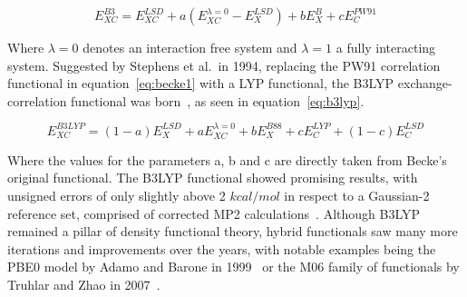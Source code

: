 \documentclass[12pt]{article}
\begin{document}
\begin{equation}
  E_{XC}^{B3} = E_{XC}^{LSD}+a(E_{XC}^{\lambda = 0}-E_{X}^{LSD})+bE_{X}^{B}+cE_{C}^{PW91}
  \label{eq:becke1}
\end{equation}

\bigskip

\noindent Where $\lambda=0$ denotes an interaction free system and $\lambda=1$ a fully interacting system.
Suggested by Stephens et al.~in 1994, replacing the PW91 correlation functional in equation~\ref{eq:becke1} with a LYP functional, the B3LYP exchange-correlation functional was born~\cite{stephens_ab_1994}, as seen in equation~\ref{eq:b3lyp}.

\begin{equation}
  E_{XC}^{B3LYP} = (1-a) E_{X}^{LSD}+aE_{XC}^{\lambda = 0}+bE_{X}^{B88}+cE_{C}^{LYP}+(1-c)E_C^{LSD}
  \label{eq:b3lyp}
\end{equation}

\bigskip

\noindent Where the values for the parameters a, b and c are directly taken from Becke's original functional.
The B3LYP functional showed promising results, with unsigned errors of only slightly above 2 $kcal/mol$ in respect to a Gaussian-2 reference set, comprised of corrected MP2 calculations~\cite{Curtiss1991}.
Although B3LYP remained a pillar of density functional theory, hybrid functionals saw many more iterations and improvements over the years, with notable examples being the PBE0 model by Adamo and Barone in 1999~\cite{Adamo1999} or the M06 family of functionals by Truhlar and Zhao in 2007~\cite{Zhao2007}.
\end{document}
